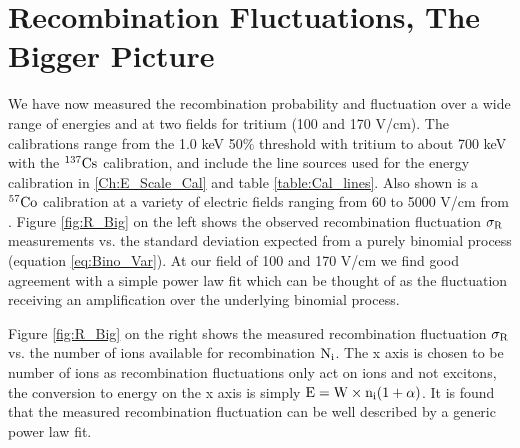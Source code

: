 \newpage

\section{Recombination Fluctuations, The Bigger Picture}
We have now measured the recombination probability and fluctuation over a wide range of energies and at two fields for tritium (100 and 170 V/cm). The calibrations range from the 1.0 keV 50\% threshold with tritium to about 700 keV with the $\rm^{137}Cs$ calibration, and include the line sources used for the energy calibration in \ref{Ch:E_Scale_Cal} and table \ref{table:Cal_lines}. Also shown is a $\rm ^{57}Co$ calibration at a variety of electric fields ranging from 60 to 5000 V/cm from \cite{Dahl_Thesis}. Figure \ref{fig:R_Big} on the left shows the observed recombination fluctuation $\rm \sigma_R$ measurements vs. the standard deviation expected from a purely binomial process (equation \ref{eq:Bino_Var}). At our field of 100 and 170 V/cm we find good agreement with a simple power law fit which can be thought of as the fluctuation receiving an amplification over the underlying binomial process.

 Figure \ref{fig:R_Big} on the right shows the measured recombination fluctuation $\rm \sigma_R$ vs. the number of ions available for recombination $\rm N_i$. The x axis is chosen to be number of ions as recombination fluctuations only act on ions and not excitons, the conversion to energy on the x axis is simply $\rm E = W\times n_i (1 + \alpha ) $. It is found that the measured recombination fluctuation can be well described by a generic power law fit.

